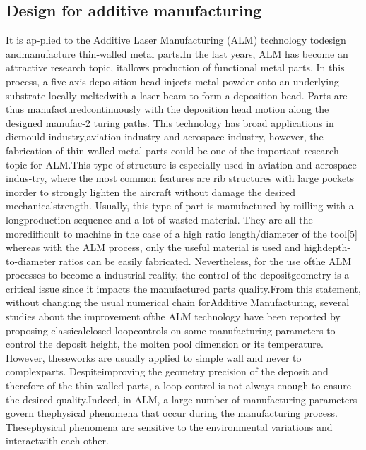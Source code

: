 \documentclass[conference]{IEEEtran}
\begin{document}
\subsection{Design for additive manufacturing}
It is ap-plied to the Additive Laser Manufacturing (ALM) technology todesign andmanufacture thin-walled metal parts.In the last years, ALM has become an attractive research topic, itallows production of functional metal parts. In this process, a five-axis depo-sition head injects metal powder onto an underlying substrate locally meltedwith a laser beam to form a deposition bead. Parts are thus manufacturedcontinuously with the deposition head motion along the designed manufac-2
turing paths. This technology has broad applications in diemould industry,aviation industry and aerospace industry, however, the fabrication of thin-walled metal parts could be one of the important research topic for ALM.This type of structure is especially used in aviation and aerospace indus-try, where the most common features are rib structures with large pockets inorder to strongly lighten the aircraft without damage the desired mechanicalstrength. Usually, this type of part is manufactured by milling with a longproduction sequence and a lot of wasted material. They are all the moredifficult to machine in the case of a high ratio length/diameter of the tool[5] whereas with the ALM process, only the useful material is used and highdepth-to-diameter ratios can be easily fabricated. Nevertheless, for the use ofthe ALM processes to become a industrial reality, the control of the depositgeometry is a critical issue since it impacts the manufactured parts quality.From this statement, without changing the usual numerical chain forAdditive Manufacturing, several studies about the improvement ofthe ALM technology have been reported by proposing classicalclosed-loopcontrols on some manufacturing parameters to control the deposit height, the molten pool dimension or its temperature. However, theseworks are usually applied to simple wall and never to complexparts. Despiteimproving the geometry precision of the deposit and therefore of the thin-walled parts, a loop control is not always enough to ensure the desired quality.Indeed, in ALM, a large number of manufacturing parameters govern thephysical phenomena that occur during the manufacturing process. Thesephysical phenomena are sensitive to the environmental variations and interactwith each other.
\end{document}
